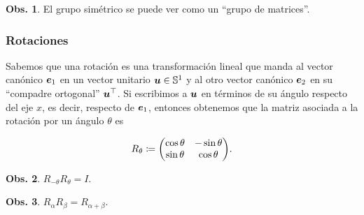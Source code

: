 \documentclass{article}
\theoremstyle{definicion}
\theoremstyle{definition}             %
\theoremstyle{definition}             %
\theoremstyle{definition}
\theoremstyle{definition}
\theoremstyle{observacion}
\newtheorem{obs}{Obs.}
\theoremstyle{definition}
\theoremstyle{plain}
\theoremstyle{definition}
\theoremstyle{afirmacion}
\theoremstyle{notation}
\theoremstyle{definition}
\begin{document}
    \begin{obs}
        El grupo simétrico se puede ver como un ``grupo de matrices''.
    \end{obs}

    \subsubsection*{Rotaciones}

    Sabemos que una rotación es una transformación lineal que manda al vector canónico \(\vb*{e}_{1}\) en un vector unitario \(\vb*{u} \in \mathbb{S}^{1}\) y al otro vector canónico \(\vb*{e}_{2}\) en su ``compadre ortogonal'' \(\vb*{u}^{\top}\). Si escribimos a \(\vb*{u}\) en términos de su ángulo respecto del eje \(x\), es decir, respecto de \(\vb*{e}_{1}\), entonces obtenemos que la matriz asociada a la rotación por un ángulo \(\theta\) es

    \begin{equation*}
        R_{\theta} \coloneq \mqty(\cos\theta & -\sin \theta \\ \sin\theta & \cos\theta).
    \end{equation*}

    \begin{obs}
        \(R_{-\theta}R_{\theta} = I\).
    \end{obs}

    \begin{obs}
        \(R_{\alpha}R_{\beta} = R_{\alpha + \beta}\).
    \end{obs}
\end{document}

